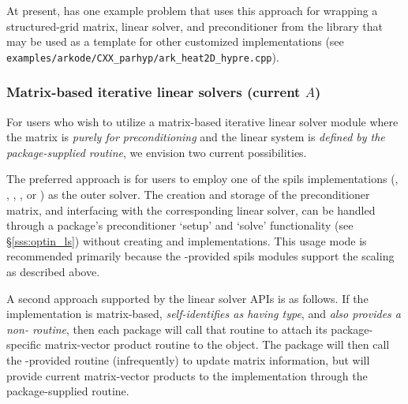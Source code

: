 At present, {\sundials} has one example problem that uses this approach for
wrapping a structured-grid matrix, linear solver, and preconditioner from the
{\hypre} library that may be used as a template for other customized
implementations
(see \texttt{examples/arkode/CXX\_parhyp/ark\_heat2D\_hypre.cpp}).

\subsubsection*{Matrix-based iterative linear solvers (current $A$)}

For users who wish to utilize a matrix-based iterative linear solver module
where the matrix is \textit{purely for preconditioning} and the linear system is
\textit{defined by the package-supplied  routine}, we envision two
current possibilities.

The preferred approach is for users to employ one of the {\sundials}
spils {\sunlinsol} implementations ({\sunlinsolspgmr}, {\sunlinsolspfgmr},
{\sunlinsolspbcgs}, {\sunlinsolsptfqmr}, or {\sunlinsolpcg}) as the outer
solver. The creation and storage of the preconditioner matrix, and interfacing
with the corresponding linear solver, can be handled through a package's
preconditioner `setup' and `solve' functionality (see \S\ref{sss:optin_ls})
without creating {\sunmatrix} and {\sunlinsol} implementations. This usage mode
is recommended primarily because the {\sundials}-provided spils modules support
the scaling as described above.

A second approach supported by the linear solver APIs is as follows. If the
{\sunlinsol} implementation is matrix-based, \textit{self-identifies
as having  type}, and \emph{also provides a
non-  routine}, then each {\sundials} package
will call that routine to attach its package-specific matrix-vector product
routine to the {\sunlinsol} object. The {\sundials} package will then call the
{\sunlinsol}-provided  routine (infrequently) to update
matrix information, but will provide current matrix-vector products to the
{\sunlinsol} implementation through the package-supplied  routine.

